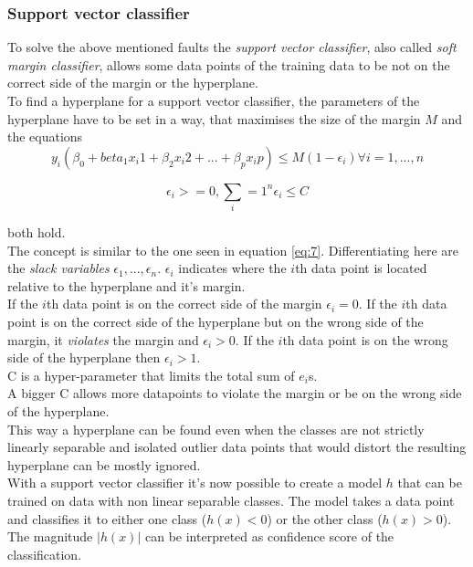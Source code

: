 \subsubsection*{Support vector classifier}

To solve the above mentioned faults the \emph{support vector classifier}, also called \emph{soft margin classifier}, allows some data points of the training data to be not on the correct side of the margin or the hyperplane. 
\\
To find a hyperplane for a support vector classifier, the parameters of the hyperplane have to be set in a way, that maximises the size of the margin $M$ and the equations 
\begin{equation} \label{eq:8}
y_i(\beta_0+beta_1 x_i1 +\beta_2 x_i2 + ... +\beta_p x_ip) \leq M(1- \epsilon_i ) \forall i=1,...,n
\end{equation}

\begin{equation} \label{eq:9}
\epsilon_i >= 0, \sum_i=1^n \epsilon_i \leq	 C
\end{equation}

both hold.\\
The concept is similar to the one seen in equation \ref{eq:7}. Differentiating here are the \emph{slack variables} $\epsilon_1, ..., \epsilon_n$. $\epsilon_i$ indicates where the $i$th data point is located relative to the hyperplane and it's margin.
\\
 If the $i$th data point is on the correct side of the margin $\epsilon_i=0$. If the $i$th data point is on the correct side of the hyperplane but on the wrong side of the margin, it \emph{violates} the margin and $\epsilon_i>0$. If the $i$th data point is on the wrong side of the hyperplane then $\epsilon_i>1$.  \\
C is a hyper-parameter that limits the total sum of $e_i$s.\\
A bigger C allows more datapoints to violate the margin or be on the wrong side of the hyperplane. \\
This way a hyperplane can be found even when the classes are not strictly linearly separable and isolated outlier data points that would  distort the resulting hyperplane can be mostly ignored.\\


With a support vector classifier it's now possible to create a model $h$ that can be trained on data with non linear separable classes. The model takes a data point and classifies it to either one class ($h(x)<0$) or the other class ($h(x)>0$). The magnitude $|h(x)|$ can be interpreted as confidence score of the classification.\cite{Burges1998} \cite{james2013introduction}


